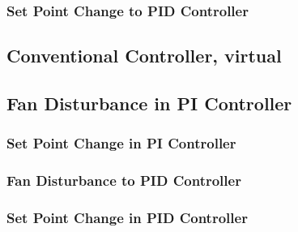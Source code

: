 \subsubsection{Set Point Change to PID Controller}
\begin{code}

\end{code}






\subsection{Conventional Controller, virtual}\label{convcode_virtual}
\subsection{Fan Disturbance in PI Controller}
\begin{code}

\end{code}


\subsubsection{Set Point Change in PI Controller}
\begin{code}

\end{code}



\subsubsection{Fan Disturbance to PID Controller}
\begin{code}

\end{code}


\subsubsection{Set Point Change in PID Controller}
\begin{code}

\end{code}



